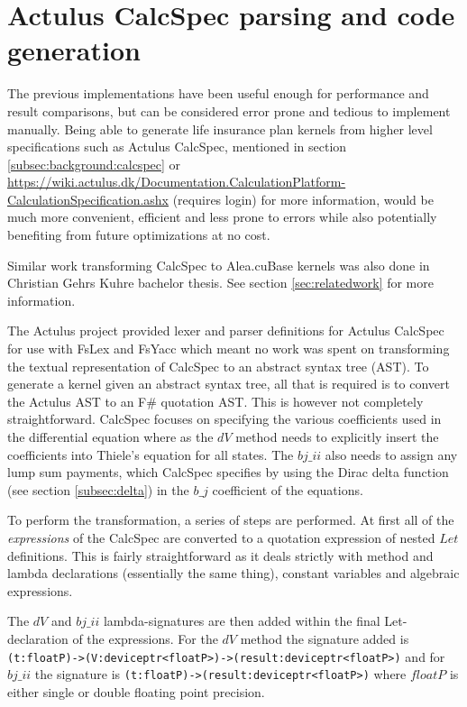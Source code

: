 \section{Actulus CalcSpec parsing and code generation}\label{sec:calcspecgeneration}
The previous implementations have been useful enough for performance and result comparisons, but can be considered error prone and tedious to implement manually.
Being able to generate life insurance plan kernels from higher level specifications such as Actulus CalcSpec, mentioned in section \ref{subsec:background:calcspec} or \\\url{https://wiki.actulus.dk/Documentation.CalculationPlatform-CalculationSpecification.ashx} (requires login) for more information, would be much more convenient, efficient and less prone to errors while also potentially benefiting from future optimizations at no cost.

Similar work transforming CalcSpec to Alea.cuBase kernels was also done in Christian Gehrs Kuhre bachelor thesis\cite{christiangk}.
See section \ref{sec:relatedwork} for more information.

The Actulus project provided lexer and parser definitions for Actulus CalcSpec for use with FsLex and FsYacc\cite{fslexfsyacc} which meant no work was spent on transforming the textual representation of CalcSpec to an abstract syntax tree (AST).
To generate a kernel given an abstract syntax tree, all that is required is to convert the Actulus AST to an F\# quotation AST.
This is however not completely straightforward.
CalcSpec focuses on specifying the various coefficients used in the differential equation where as the $dV$ method needs to explicitly insert the coefficients into Thiele's equation for all states. 
The $bj\_ii$ also needs to assign any lump sum payments, which CalcSpec specifies by using the Dirac delta function (see section \ref{subsec:delta}) in the $b\_j$ coefficient of the equations.

To perform the transformation, a series of steps are performed.
At first all of the \emph{expressions} of the CalcSpec are converted to a quotation expression of nested $Let$ definitions.
This is fairly straightforward as it deals strictly with method and lambda declarations (essentially the same thing), constant variables and algebraic expressions.


The $dV$ and $bj\_ii$ lambda-signatures are then added within the final Let-declaration of the expressions.
For the $dV$ method the signature added is \\\lstinline$(t:floatP)->(V:deviceptr<floatP>)->(result:deviceptr<floatP>)$ and for $bj\_ii$ the signature is \lstinline$(t:floatP)->(result:deviceptr<floatP>)$ where $floatP$ is either single or double floating point precision.

